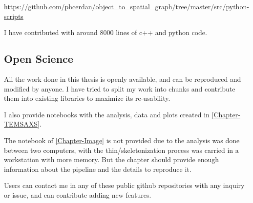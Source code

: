 \noindent\url{https://github.com/phcerdan/object_to_spatial_graph/tree/master/src/python-scripts}

I have contributed with around 8000 lines of c++ and python code.

\subsection{Open Science}%
\label{sub:open_science}

All the work done in this thesis is openly available, and can be reproduced and modified by anyone.
I have tried to split my work into chunks and contribute them into existing libraries to maximize its re-usability.

I also provide notebooks with the analysis, data and plots created in \autoref{Chapter-TEMSAXS}.

The notebook of \autoref{Chapter-Image} is not provided due to the analysis was done between two computers, with the thin/skeletonization process was carried in a workstation with more memory.
But the chapter should provide enough information about the pipeline and the details to reproduce it.

Users can contact me in any of these public github repositories with any inquiry or issue, and can contribute adding new features.








